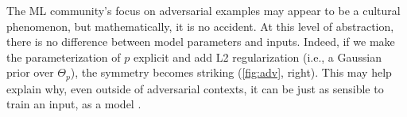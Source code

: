 The ML community's focus on adversarial examples
    may appear to be a cultural phenomenon,
    but mathematically,
     it is no accident.
At this level of abstraction, there is no difference between
    model parameters and inputs.
Indeed, if we make the parameterization of $p$ explicit
and add L2 regularization
(i.e., a Gaussian prior over $\Theta_p$),
the symmetry
becomes striking (\cref{fig:adv}, right).
This may help explain why,
    even outside of adversarial contexts,
it can be just as sensible to train an input, as a model \cite{FNNS}.
